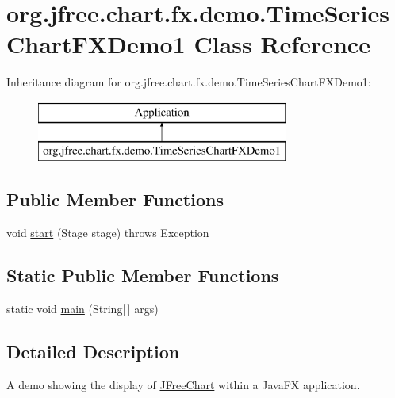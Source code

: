 \hypertarget{classorg_1_1jfree_1_1chart_1_1fx_1_1demo_1_1_time_series_chart_f_x_demo1}{}\section{org.\+jfree.\+chart.\+fx.\+demo.\+Time\+Series\+Chart\+F\+X\+Demo1 Class Reference}
\label{classorg_1_1jfree_1_1chart_1_1fx_1_1demo_1_1_time_series_chart_f_x_demo1}
Inheritance diagram for org.\+jfree.\+chart.\+fx.\+demo.\+Time\+Series\+Chart\+F\+X\+Demo1\+:\begin{figure}[H]
\begin{center}
\leavevmode
\includegraphics[height=2.000000cm]{classorg_1_1jfree_1_1chart_1_1fx_1_1demo_1_1_time_series_chart_f_x_demo1}
\end{center}
\end{figure}
\subsection*{Public Member Functions}
\begin{DoxyCompactItemize}
\item 
void \mbox{\hyperlink{classorg_1_1jfree_1_1chart_1_1fx_1_1demo_1_1_time_series_chart_f_x_demo1_a78372adfd6f8c6bd90ba9ecff8f85da3}{start}} (Stage stage)  throws Exception 
\end{DoxyCompactItemize}
\subsection*{Static Public Member Functions}
\begin{DoxyCompactItemize}
\item 
static void \mbox{\hyperlink{classorg_1_1jfree_1_1chart_1_1fx_1_1demo_1_1_time_series_chart_f_x_demo1_a9025905d8eb4cf676112e36a4c86a4a7}{main}} (String\mbox{[}$\,$\mbox{]} args)
\end{DoxyCompactItemize}


\subsection{Detailed Description}
A demo showing the display of \mbox{\hyperlink{classorg_1_1jfree_1_1chart_1_1_j_free_chart}{J\+Free\+Chart}} within a Java\+FX application.

